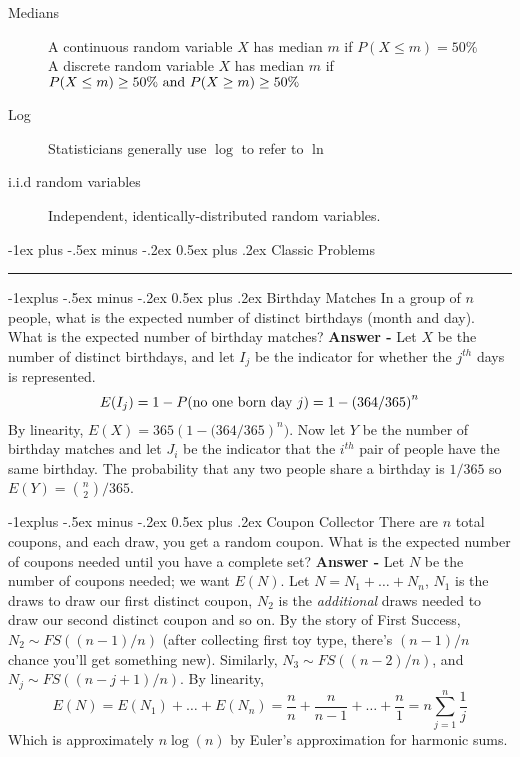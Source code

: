 \documentclass[10pt,landscape]{article}
\makeatletter
\theoremstyle{definition}
\renewcommand{\section}{\@startsection{section}{1}{0mm}%
                                {-1ex plus -.5ex minus -.2ex}%
                                {0.5ex plus .2ex}%
                                {\normalfont\large\bfseries}}
\renewcommand{\subsection}{\@startsection{subsection}{2}{0mm}%
                                {-1explus -.5ex minus -.2ex}%
                                {0.5ex plus .2ex}%
                                {\normalfont\normalsize\bfseries}}
\makeatother
\begin{document}
\begin{multicols}{3}
\begin{description}
\item[Medians] A continuous random variable $X$ has median $m$ if
$P(X \leq m) = 50\%$ \\
A discrete random variable $X$ has median $m$ if
$P(X \leq m) \geq 50\% \textnormal{ and } P(X \geq m) \geq 50\%$
\item[Log] Statisticians generally use $\log$ to refer to $\ln$
\item[i.i.d random variables] Independent, identically-distributed random variables.

\end{description}


\section{Classic Problems} \smallskip \hrule height 2pt \smallskip

\subsection{Birthday Matches} In a group of $n$ people, what is the expected number of distinct birthdays (month and day). What is the expected number of birthday matches? \textbf{Answer -} Let $X$ be the number of distinct birthdays, and let $I_j$ be the indicator for whether the $j^{th}$ days is represented. \[E(I_j) = 1-P(\textnormal{no one born day }j) = 1 - \left(364/365\right)^n\] By linearity, $\boxed{E(X) = 365\left(1-(364/365\right)^n)}$. 
Now let $Y$ be the number of birthday matches and let $J_i$ be the indicator that the $i^{th}$ pair of people have the same birthday. The probability that any two people share a birthday is $1/365$ so $\boxed{E(Y) = \binom{n}{2} / 365}$. 

\subsection{Coupon Collector}
There are $n$ total coupons, and each draw, you get a random coupon. What is the expected number of coupons needed until you have a complete set? \textbf{Answer - } Let $N$ be the number of coupons needed; we want $E(N)$. Let $N = N_1 + \dots + N_n$, $N_1$ is the draws to draw our first distinct coupon, $N_2$ is the \emph{additional} draws needed to draw our second distinct coupon and so on. By the story of First Success, $N_2 \sim FS((n-1)/n)$ (after collecting first toy type, there's $(n-1)/n$ chance you'll get something new). Similarly, $N_3 \sim FS((n-2)/n)$, and $N_j \sim FS((n-j+1)/n)$. By linearity,
\[E(N) = E(N_1) + \dots + E(N_n) = \frac{n}{n} + \frac{n}{n-1} + \dots + \frac{n}{1} = \boxed{n\sum^n_{j=1} \frac{1}{j}}\]
Which is approximately $n \log(n)$ by Euler's approximation for harmonic sums.


\end{multicols}
\end{document}
